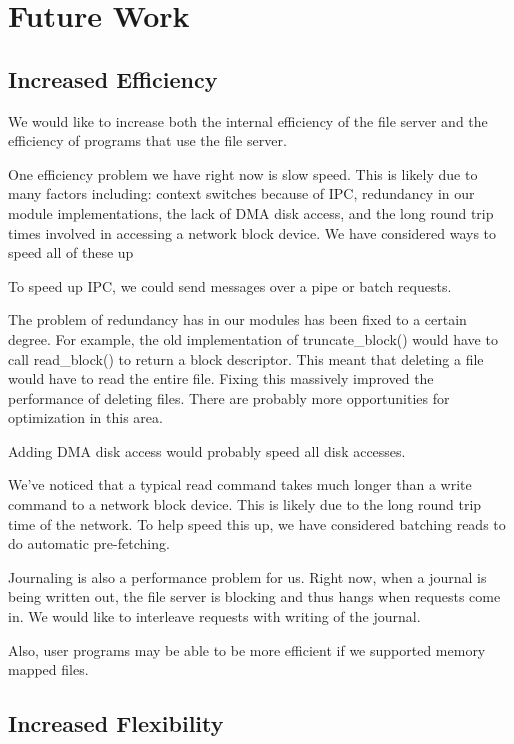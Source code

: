 \section{Future Work}
\label{sec:future}

\subsection{Increased Efficiency}

We would like to increase both the internal efficiency of the file
server and the efficiency of programs that use the file server.

One efficiency problem we have right now is slow speed. This is likely
due to many factors including: context switches because of IPC,
redundancy in our module implementations, the lack of DMA disk access,
and the long round trip times involved in accessing a network block
device. We have considered ways to speed all of these up

To speed up IPC, we could send messages over a pipe or batch requests.

The problem of redundancy has in our modules has been fixed to a
certain degree. For example, the old implementation of
truncate_block() would have to call read_block() to return a block
descriptor. This meant that deleting a file would have to read the
entire file. Fixing this massively improved the performance of
deleting files. There are probably more opportunities for optimization
in this area.

Adding DMA disk access would probably speed all disk accesses.

We've noticed that a typical read command takes much longer than a
write command to a network block device. This is likely due to the
long round trip time of the network. To help speed this up, we have
considered batching reads to do automatic pre-fetching.

Journaling is also a performance problem for us. Right now, when a
journal is being written out, the file server is blocking and thus
hangs when requests come in. We would like to interleave requests with
writing of the journal.

Also, user programs may be able to be more efficient if we supported
memory mapped files.

\subsection{Increased Flexibility}

